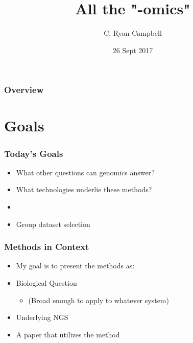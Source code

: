 \documentclass[14pt]{beamer}
\title[-omics]{All the "-omics"} %
\author{C. Ryan Campbell} %
\institute[Duke] %
{
Duke University \\ %
\medskip
\textit{c.ryan.campbell@duke.edu} %
}
\date{26 Sept 2017} %
\begin{document}
\begin{frame}
\titlepage %
\end{frame}

\begin{frame}
\frametitle{Overview} %
\tableofcontents %
\end{frame}


\section{Goals} 

\begin{frame}
\frametitle{Today's Goals}
\begin{itemize}
	\item What other questions can genomics answer?
	\item What technologies underlie these methods?
	\item[]
	\item Group dataset selection
\end{itemize}
\end{frame}

\begin{frame}
\frametitle{Methods in Context}
\begin{itemize}
	\large
	\item[] My goal is to present the methods as:
	\normalsize
	\item Biological Question
	\begin{itemize}
		\item[] (Broad enough to apply to whatever system)
	\end{itemize}
	\item Underlying NGS
	\item A paper that utilizes the method
\end{itemize}
\end{frame}
\end{document}
